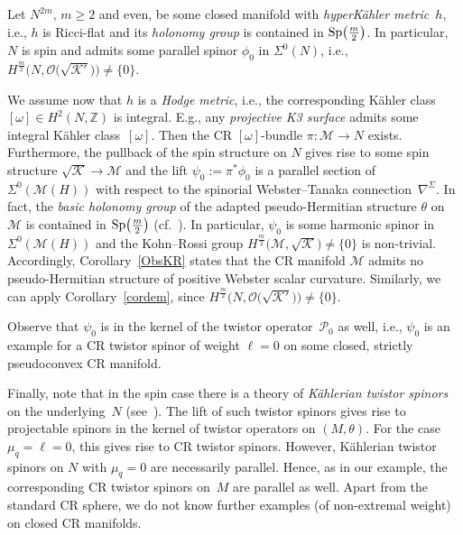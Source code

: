 \documentclass[10pt,a4paper]{amsart}
\numberwithin{equation}{section}
\newcommand{\ZZ}{\mathbb{Z}}
\begin{document}
\begin{Example} Let $N^{2m}$, $m\geq 2$ and even, be some closed manifold with {\em hyperK\"ahler metric}~$h$, i.e.,
$h$ is Ricci-flat and its {\em holonomy group} is contained in ${\rm Sp}\big(\frac{m}{2}\big)$.
In particular, $N$ is spin and admits some parallel spinor $\phi_0$ in $\Sigma^0(N)$, i.e., $H^{\frac{m}{2}}\big(N,\mathcal{O}\big(\sqrt{\mathcal{K}'}\big)\big)\neq \{0\}$.

We assume now that $h$ is a {\em Hodge metric}, i.e., the corresponding K\"ahler class $[\omega]\in H^2(N,\ZZ)$ is integral.
E.g., any {\em projective K3 surface} admits some integral K\"ahler class~$[\omega]$.
Then the CR $[\omega]$-bundle $\pi\colon \mathcal{M}\to N$ exists. Furthermore, the pullback of the spin structure on $N$ gives rise to some spin structure
$\sqrt{\mathcal{K}}\to\mathcal{M}$ and the lift $\psi_0:=\pi^*\phi_0$ is a parallel section of $\Sigma^0(\mathcal{M}(H))$ with respect to
the spinorial Webster--Tanaka connection~$\nabla^\Sigma$.
In fact, the {\em basic holonomy group} of the adapted pseudo-Hermitian structure $\theta$ on $\mathcal{M}$
is contained in ${\rm Sp}\big(\frac{m}{2}\big)$ (cf.~\cite{LeiN2}). In
particular, $\psi_0$ is some harmonic spinor in $\Sigma^0(\mathcal{M}(H))$ and the Kohn--Rossi group
$H^{\frac{m}{2}}\big(\mathcal{M},\sqrt{\mathcal{K}}\big)\neq \{0\}$ is non-trivial. Accordingly, Corollary~\ref{ObsKR} states that the CR manifold $\mathcal{M}$ admits no pseudo-Hermitian
structure of positive Webster scalar curvature. Similarly, we can apply Corollary~\ref{cordem}, since $H^{\frac{m}{2}}\big(N,\mathcal{O}\big(\sqrt{\mathcal{K}'}\big)\big)\neq \{0\}$.

Observe that $\psi_0$ is in the kernel of the twistor operator~$\mathcal{P}_0$ as well, i.e.,
$\psi_0$ is an example for a CR twistor spinor of weight $\ell=0$ on some closed, strictly pseudoconvex CR manifold.

Finally, note that in the spin case there is a theory of {\em K\"ahlerian twistor spinors} on
the underlying~$N$ (see~\cite{Mor,Pil}). The lift of such twistor spinors gives rise
to projectable spinors in the kernel of twistor operators on $(M,\theta)$. For the case $\mu_q=\ell=0$, this gives rise to CR twistor spinors.
However, K\"ahlerian twistor spinors on $N$ with $\mu_q=0$ are necessarily parallel. Hence, as in our example,
the corresponding CR twistor spinors on~$M$ are parallel as well. Apart from the standard CR sphere, we do not know
further examples (of non-extremal weight) on closed CR manifolds.
\end{Example}
\end{document}
